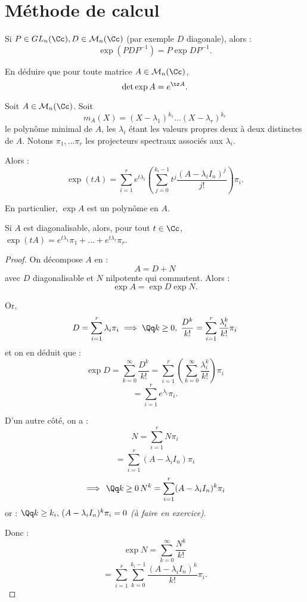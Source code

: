 \documentclass[class=report,crop=false]{standalone}
\newcommand{\GL}{GL}
\newcommand{\exoo}{\emph{(à faire en exercice)}}
\begin{document}
\section{Méthode de calcul}

\begin{exercicecours}
Si $P \in \GL_n(\Cc), D\in \mathcal{M}_n(\Cc)$ (par exemple $D$ diagonale), alors :
\[\exp (PDP^{-1}) = P\exp D P^{-1} .\]

En déduire que pour toute matrice $A \in \mathcal{M}_n(\Cc)$, 
\[\det \exp A = e^{\tr A} .\]
 \end{exercicecours}

\begin{proposition}\label{pro:formulexpo}
Soit $A \in \mathcal{M}_n(\Cc)$. Soit \[m_A(X)  = (X-\lambda_1)^{k_1}... (X-\lambda_r)^{k_r}\]
le polynôme minimal de $A$, les $\lambda_i$ étant les valeurs propres deux à deux distinctes de $A$. Notons $\pi_1,...\pi_r$ les projecteurs spectraux associés aux $\lambda_i$.

Alors :
\[\exp (tA) = \sum_{i=1}^re^{t\lambda_i}\left(\sum_{j=0}^{k_i-1}t^j\frac{(A-\lambda_iI_n)^j}{j!}\right) \pi_i .\] 

En particulier, $\exp A$ est un polynôme en $A$.
\end{proposition}

\begin{remarque*}
Si $A$ est diagonalisable, alors, pour tout $t \in \Cc$, $\exp (tA) = e^{t\lambda_1}\pi_1 + ... +e^{t\lambda_r} \pi_r$.
\end{remarque*}

\begin{proof}
On décompose $A$ en : \[A = D+N \]
avec $D$ diagonalisable et $N$ nilpotente qui commutent. Alors : 
\[\exp A = \exp D \exp N.\]

Or, \[ D= \sum_{i=1}^r \lambda_i \pi_i \implies \Qq k \ge 0,\; \frac{D^k}{k!} = \sum_{i=1}^r\frac{\lambda_i^k}{k!}\pi_i\]
et on en déduit que :
\[\exp D = \sum_{k=0}^\infty \frac{D^k}{k!} = \sum_{i=1}^r \left(\sum_{k=0}^\infty \frac{\lambda_i^k}{k!} \right)\pi_i\]
\[= \sum_{i=1}^r e^{\lambda_i}\pi_i .\] 

D'un autre côté, on a :
\[N = \sum_{i=1}^r N\pi_i\]
\[= \sum_{i=1}^r (A-\lambda_iI_n)\pi_i\]
\[\implies \, \Qq k \ge 0\, N^k = \sum_{i=1}^r (A-\lambda_iI_n)^k\pi_i \]
or : $\Qq k \ge k_i,\, (A-\lambda_iI_n)^k\pi_i = 0$ \exoo. 

Donc :
 \[\exp N = \sum_{k=0}^\infty \frac{N^k}{k!} \]
\[= \sum_{i=1}^r \sum_{k=0}^{k_i-1} \frac{(A-\lambda_iI_n)^k}{k!} \pi_i.\]
\end{proof}
\end{document}
